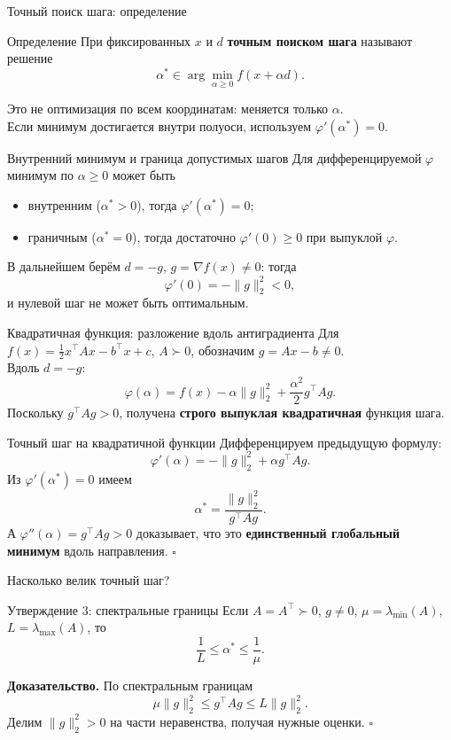 \documentclass[aspectratio=169,10pt]{beamer}
\begin{document}
\begin{frame}{Точный поиск шага: определение}
\small
\begin{block}{Определение}
При фиксированных $x$ и $d$ \textbf{точным поиском шага} называют решение
\[
\boxed{\alpha^*\in\arg\min_{\alpha\ge0} f(x+\alpha d).}
\]
\end{block}
Это не оптимизация по всем координатам: меняется только $\alpha$.\\[.5em]
Если минимум достигается внутри полуоси, используем
$\varphi'(\alpha^*)=0$.
\end{frame}

\begin{frame}{Внутренний минимум и граница допустимых шагов}
\small
Для дифференцируемой $\varphi$ минимум по $\alpha\ge0$ может быть
\begin{itemize}
\item внутренним ($\alpha^*>0$), тогда $\varphi'(\alpha^*)=0$;
\item граничным ($\alpha^*=0$), тогда достаточно $\varphi'(0)\ge0$ при выпуклой $\varphi$.
\end{itemize}
В дальнейшем берём $d=-g$, $g=\nabla f(x)\ne0$: тогда
\[
\varphi'(0)=-\|g\|_2^2<0,
\]
и нулевой шаг не может быть оптимальным.
\end{frame}

\begin{frame}{Квадратичная функция: разложение вдоль антиградиента}
\small
Для $f(x)=\frac12x^\top Ax-b^\top x+c$, $A\succ0$, обозначим $g=Ax-b\ne0$.\\[.5em]
Вдоль $d=-g$:
\[
\boxed{\varphi(\alpha)=f(x)-\alpha\|g\|_2^2
+\frac{\alpha^2}{2}g^\top Ag.}
\]
Поскольку $g^\top Ag>0$, получена \textbf{строго выпуклая квадратичная} функция шага.
\end{frame}

\begin{frame}{Точный шаг на квадратичной функции}
\small
Дифференцируем предыдущую формулу:
\[
\varphi'(\alpha)=-\|g\|_2^2+\alpha g^\top Ag.
\]
Из $\varphi'(\alpha^*)=0$ имеем
\[
\boxed{\alpha^*=\frac{\|g\|_2^2}{g^\top Ag}.}
\]
А $\varphi''(\alpha)=g^\top Ag>0$ доказывает, что это \textbf{единственный глобальный минимум} вдоль направления. $\square$
\end{frame}

\begin{frame}{Насколько велик точный шаг?}
\small
\begin{block}{Утверждение 3: спектральные границы}
Если $A=A^\top\succ0$, $g\ne0$, $\mu=\lambda_{\min}(A)$, $L=\lambda_{\max}(A)$, то
\[
\boxed{\frac1L\le\alpha^*\le\frac1\mu.}
\]
\end{block}
\textbf{Доказательство.} По спектральным границам
\[
\mu\|g\|_2^2\le g^\top Ag\le L\|g\|_2^2.
\]
Делим $\|g\|_2^2>0$ на части неравенства, получая нужные оценки. $\square$
\end{frame}
\end{document}
